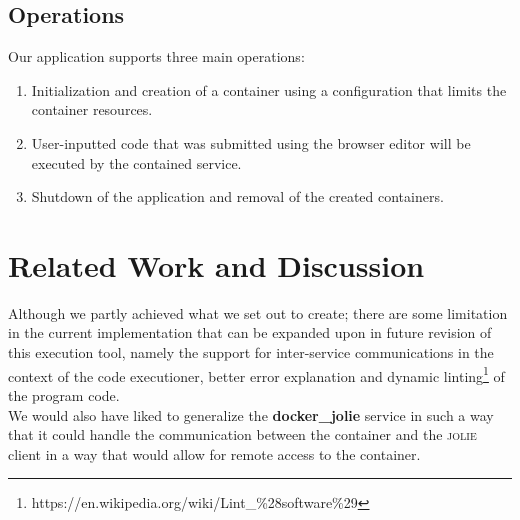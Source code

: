 \documentclass[12pt]{article}
\newcommand{\jolie}[0] {\textsc{jolie}}
\begin{document}
\subsection{Operations}
Our application supports three main operations:
\begin{enumerate}
\item Initialization and creation of a container using a configuration that limits the container resources.
\item User-inputted code that was submitted using the browser editor will be executed by the contained service.
\item Shutdown of the application and removal of the created containers.
\end{enumerate}


\section{Related Work and Discussion}

Although we partly achieved what we set out to create; there are some limitation in the current implementation that can be expanded upon in future revision of this execution tool, namely the support for inter-service communications in the context of the code executioner, better error explanation and dynamic linting\footnote{https://en.wikipedia.org/wiki/Lint\_\%28software\%29} of the program code.\\

\noindent{}We would also have liked to generalize the \textbf{docker\_jolie} service in such a way that it could handle the communication between the container and the \jolie{} client in a way that would allow for remote access to the container.

 

\end{document}
